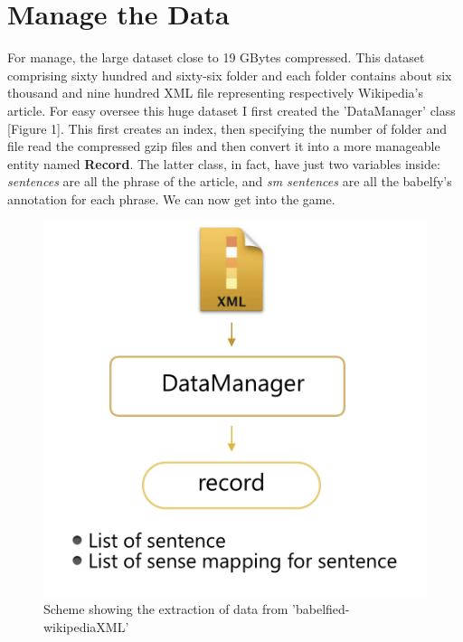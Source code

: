 \documentclass[conference,compsoc]{IEEEtran}
\begin{document}
\section{Manage the Data}
For manage, the large dataset close to 19 GBytes compressed. This dataset comprising sixty hundred and sixty-six folder and each folder contains about six thousand and nine hundred XML file representing respectively Wikipedia's article.
For easy oversee this huge dataset I first created the 'DataManager' class [Figure 1]. This first creates an index, then specifying the number of folder and file read the compressed gzip files and then convert it into a more manageable entity named \textbf{Record}. The latter class, in fact, have just two variables inside:
\textit{sentences} are all the phrase of the article, and \textit{sm sentences} are all the babelfy's annotation for each phrase. We can now get into the game. 
\begin{figure}[h]
\centering
\includegraphics[scale=0.27]{datamanager2}
\caption{ Scheme showing the extraction of data from 'babelfied-wikipediaXML' }
\end{figure}
\end{document}
